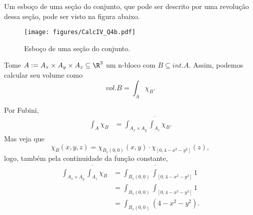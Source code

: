 \documentclass[a4paper]{report}
\begin{document}
Um esboço de uma seção do conjunto, que pode ser descrito por uma revolução dessa seção, pode ser visto na figura abaixo.

\begin{figure}[H]
    \centering
    \texttt{[image: figures/CalcIV\_Q4b.pdf]}
    \caption*{Esboço de uma seção do conjunto.}
    \label{fig:figures-CalcIV_Q4b-pdf}
\end{figure}


Tome $A :=A_x \times A_y\times A_z\subseteq\R^{3} $ um n-bloco com $B\subseteq int. A$. Assim, podemos calcular seu volume como \[
vol. B = \int_A \chi_B
.\] 

Por Fubini,  
\begin{align*}
    \int_A \chi_B &= \int_{A_x \times A_y} \overline{\int_{A_z}} \chi_B
.\end{align*}
Mas veja que \[
\chi_B\left( x,y,z \right) = \chi_{B_1\left( 0,0 \right)  }\left( x, y \right) \cdot \chi_{\left[ 0, 4-x^2 - y^2 \right] }\left( z \right) 
,\] logo, também pela continuidade da função constante,
\begin{align*}
    \int_{A_x \times A_y} \overline{\int_{A_z}} \chi_B &=  \int_{B_1\left( 0,0 \right) } \overline{\int}_{\left[ 0, 4-x^2-y^2 \right] } 1 \\
    &=  \int_{B_1\left( 0,0 \right) } \int_{\left[ 0, 4-x^2-y^2 \right] } 1 \\
    &= \int_{B_1\left( 0,0 \right) } \left( 4-x^2-y^2 \right)
.\end{align*}
\end{document}
